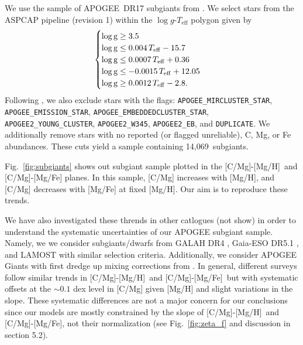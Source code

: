 \documentclass[fleqn,
usenatbib]{mnras}
\newcommand{\nsubgiants}{14,069}
\newcommand{\apogee}{APOGEE}
\newcommand{\caah}{[C/Mg]-[Mg/H]}
\newcommand{\caafe}{[C/Mg]-[Mg/Fe]}
\newcommand{\dbadd}[1]{{\color{Thistle} #1}}
\begin{document}
We use the sample of \apogee\ DR17 subgiants from \citet{jack}. We select stars from the ASPCAP pipeline (revision 1) within the $\log g$-$T_\text{eff}$ polygon given by
 \begin{equation}
    \begin{cases} \label{eq:subgiant_selection}
        \log \text{g} \geq 3.5 \\
        \log \text{g} \leq 0.004\,T_{\rm eff} - 15.7 \\
        \log \text{g} \leq 0.0007\,T_{\rm eff} + 0.36 \\
        \log \text{g} \leq -0.0015\,T_{\rm eff} + 12.05 \\
        \log \text{g} \geq 0.0012\,T_{\rm eff} - 2.8. \\
    \end{cases}
\end{equation}
Following \citet{jack}, we also exclude stars with the flags:
        \verb|APOGEE_MIRCLUSTER_STAR|,
        \verb|APOGEE_EMISSION_STAR|,
        \verb|APOGEE_EMBEDDEDCLUSTER_STAR|,
        \verb|APOGEE2_YOUNG_CLUSTER|,
        \verb|APOGEE2_W345|,
        \verb|APOGEE2_EB|, and
        \verb|DUPLICATE|.
We additionally remove stars with no reported (or flagged unreliable), C, Mg, or Fe abundances. These cuts yield a sample containing \nsubgiants\ subgiants.


Fig.~\ref{fig:subgiants} shows out subgiant sample plotted in the \caah\ and \caafe{} planes.\footnotemark{} In this sample, [C/Mg] increases with [Mg/H], and [C/Mg] decreases with [Mg/Fe] at fixed [Mg/H]. Our aim is to reproduce these trends.



We have also investigated these thrends in other catlogues (not show) in order to understand the systematic uncertainties of our APOGEE subgiant sample.
Namely, we we consider subgiants/dwarfs from GALAH DR4 \citep{galah_dr4}, Gaia-ESO DR5.1 \citep{gaiaeso_dr5.1}, and LAMOST \citep{lamost} with similar selection criteria. Additionally, we consider APOGEE Giants with first dredge up mixing corrections from \citep{vincenzo+21}.
In general, different surveys follow similar trends in \caah\ and \caafe\ but with systematic offsets at the $\sim{0.1}$ dex level in [C/Mg] given [Mg/H] and slight variations in the slope.
These systematic differences are not a major concern for our conclusions since our models are mostly constrained by the slope of \caah\ and \caafe,  not their normalization (see Fig.~\ref{fig:zeta_f} and discussion in section \dbadd{5.2}).
\end{document}
